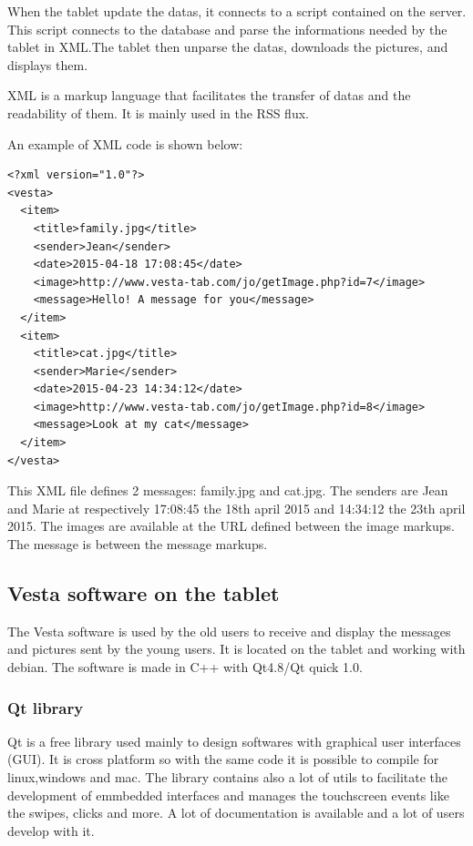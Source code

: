 When the tablet update the datas, it connects to a script contained on the server. This script connects to the database and parse the informations needed by the tablet in XML.The tablet then unparse the datas, downloads the pictures, and displays them.

XML is a markup language that facilitates the transfer of datas and the readability of them. It is mainly used in the RSS flux.


An example of XML code is shown below:



\begin{lstlisting}
<?xml version="1.0"?>
<vesta>
  <item>
    <title>family.jpg</title>
    <sender>Jean</sender>
    <date>2015-04-18 17:08:45</date>    
    <image>http://www.vesta-tab.com/jo/getImage.php?id=7</image>
    <message>Hello! A message for you</message>
  </item>
  <item>
    <title>cat.jpg</title>
    <sender>Marie</sender>
    <date>2015-04-23 14:34:12</date>
    <image>http://www.vesta-tab.com/jo/getImage.php?id=8</image>
    <message>Look at my cat</message>
  </item>
</vesta>
\end{lstlisting}

This XML file defines 2 messages: family.jpg and cat.jpg. The senders are Jean and Marie at respectively 17:08:45 the 18th april 2015 and 14:34:12 the 23th april 2015. The images are available at the URL defined between the image markups. The message is between the message markups.

\clearpage

\subsection{Vesta software on the tablet}
The Vesta software is used by the old users to receive and display the messages and pictures sent by the young users. It is located on the tablet and working with debian. The software is made in C++ with Qt4.8/Qt quick 1.0.

\subsubsection{Qt library}
Qt is a free library used mainly to design softwares with graphical user interfaces (GUI). It is cross platform so with the same code it is possible to compile for linux,windows and mac.
The library contains also a lot of utils to facilitate the development of emmbedded interfaces and manages the touchscreen events like the swipes, clicks and more. A lot of documentation is available and a lot of users develop with it.

